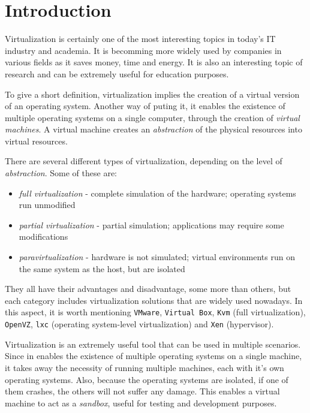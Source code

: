 \chapter{Introduction} \label{chapter:intro}
Virtualization is certainly one of the most interesting topics in today's IT industry and 
academia. It is becomming more widely used by companies in various fields as 
it saves money, time and energy\cite{hess}. It is also an interesting topic of research 
and can be extremely useful for education purposes. 

To give a short definition, virtualization implies the creation of a virtual 
version of an operating system\cite{virt}. Another way of puting it, it enables the existence of 
multiple operating systems on a single computer, through the creation of 
\emph{virtual machines}. A virtual machine creates an \emph{abstraction} 
of the physical resources into virtual resources.

There are several different types of virtualization, depending on the level 
of \emph{abstraction}\cite{osc}. Some of these are:
\begin{itemize}
  \item \emph{full virtualization} - complete simulation of the hardware; operating 
systems run unmodified
  \item \emph{partial virtualization} - partial simulation; applications may require 
some modifications
  \item \emph{paravirtualization} - hardware is not simulated; virtual environments 
run on the same system as the host, but are isolated
\end{itemize}

They all have their advantages and disadvantage, some more than others, but each category includes 
virtualization solutions that are widely used nowadays. In this aspect, it is 
worth mentioning \texttt{VMware}, \texttt{Virtual Box}, \texttt{Kvm} (full virtualization), 
\texttt{OpenVZ}, \texttt{lxc} (operating system-level virtualization) and \texttt{Xen} (hypervisor).

Virtualization is an extremely useful tool that can be used in multiple 
scenarios. Since in enables the existence of multiple operating systems on a 
single machine, it takes away the necessity of running multiple machines, each 
with it's own operating systems. Also, because the operating systems are 
isolated, if one of them crashes, the others will not suffer any damage. This 
enables a virtual machine to act as a \emph{sandbox}, useful for testing 
and development purposes.

